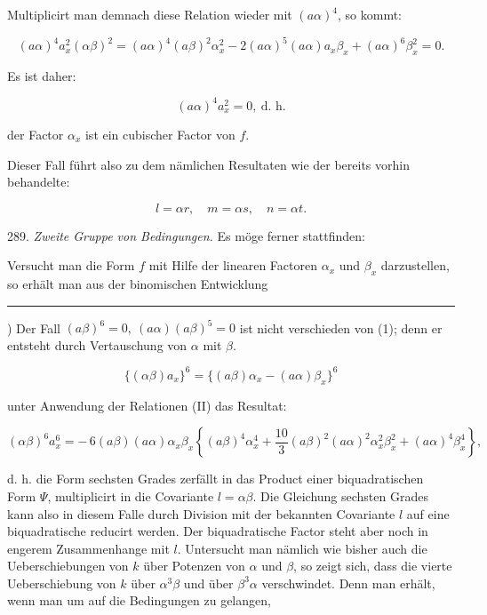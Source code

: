 Multiplicirt man demnach diese Relation wieder mit $(a\alpha)^4$, so kommt:

\[ (a\alpha)^4 a_x^2 (\alpha\beta)^2 = (a\alpha)^4(a\beta)^2\alpha_x^2 - 2(a\alpha)^5(a\alpha) a_x\beta_x + (a\alpha)^6\beta_x^2 = 0. \]

Es ist daher:

\[ (a\alpha)^4 a_x^2 = 0,\ \text{d. h.} \]

\glqq der Factor $\alpha_x$ ist ein cubischer Factor von $f$\grqq{}.

Dieser Fall führt also zu dem nämlichen Resultaten wie der bereits vorhin behandelte: %

\[ l = \alpha r,\quad m = \alpha s,\quad n = \alpha t. \]

289. \textit{Zweite Gruppe von Bedingungen.} Es möge ferner stattfinden:


Versucht man die Form $f$ mit Hilfe der linearen Factoren $\alpha_x$ und $\beta_x$ darzustellen, so erhält man aus der binomischen Entwicklung

\noindent\rule{4cm}{0.4pt}

\noindent *) Der Fall $(a\beta)^6=0,\ (a\alpha)(a\beta)^5=0$ ist nicht verschieden von (1); denn er entsteht durch Vertauschung von $\alpha$ mit $\beta$.



\[ \{(\alpha\beta) a_x\}^6 = \{(a\beta)\alpha_x - (a\alpha)\beta_x\}^6 \]

unter Anwendung der Relationen (II) das Resultat:

\[ (\alpha\beta)^6 a_x^6 = -\,6(a\beta)(a\alpha)\alpha_x\beta_x \left\{ (a\beta)^4\alpha_x^4 + \frac{10}{3}(a\beta)^2(a\alpha)^2\alpha_x^2\beta_x^2 + (a\alpha)^4\beta_x^4 \right\}, \]

d. h. die Form sechsten Grades zerfällt in das Product einer biquadratischen Form $\Psi$, multiplicirt in die Covariante $l=\alpha\beta$. Die Gleichung sechsten Grades kann also in diesem Falle durch Division mit der bekannten Covariante $l$ auf eine biquadratische reducirt werden. Der biquadratische Factor steht aber noch in engerem Zusammenhange mit $l$. Untersucht man nämlich wie bisher auch die Ueberschiebungen von $k$ über Potenzen von $\alpha$ und $\beta$, so zeigt sich, dass die vierte Ueberschiebung von $k$ über $\alpha^3\beta$ und über $\beta^3\alpha$ verschwindet. Denn man erhält, wenn man um auf die Bedingungen zu gelangen,

